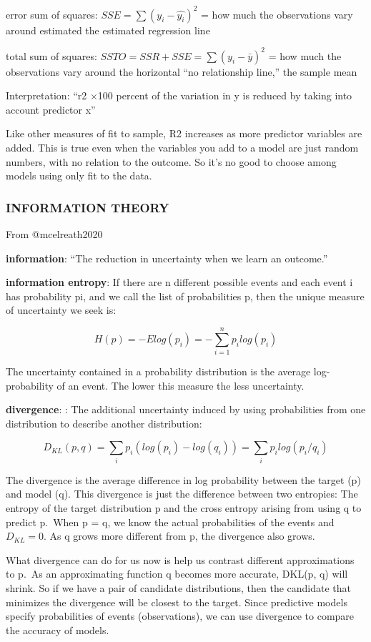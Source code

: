 \documentclass[
]{article}
\begin{document}
error sum of squares: \(SSE = \sum(y_i- \hat{y_i})^2\) = how much the
observations vary around estimated the estimated regression line

total sum of squares: \(SSTO = SSR + SSE =\sum(y_i- \bar{y})^2\) = how
much the observations vary around the horizontal ``no relationship
line,'' the sample mean

Interpretation: ``r2 ×100 percent of the variation in y is reduced by
taking into account predictor x''

Like other measures of fit to sample, R2 increases as more predictor
variables are added. This is true even when the variables you add to a
model are just random numbers, with no relation to the outcome. So it's
no good to choose among models using only fit to the data.

\hypertarget{information-theory}{%
\subsubsection{INFORMATION THEORY}\label{information-theory}}

From @mcelreath2020

\textbf{information}: ``The reduction in uncertainty when we learn an
outcome.''

\textbf{information entropy}: If there are n different possible events
and each event i has probability pi, and we call the list of
probabilities p, then the unique measure of uncertainty we seek is:

\[H(p) = -E log(p_i) = -\sum_{i=1}^n p_i log(p_i)\]

The uncertainty contained in a probability distribution is the average
log-probability of an event. The lower this measure the less
uncertainty.

\textbf{divergence}: : The additional uncertainty induced by using
probabilities from one distribution to describe another distribution:

\[D_{KL} (p,q) = \sum_{i} p_i (log(p_i)-log(q_i)) = \sum_{i} p_i log(p_i/q_i)\]

The divergence is the average difference in log probability between the
target (p) and model (q). This divergence is just the difference between
two entropies: The entropy of the target distribution p and the cross
entropy arising from using q to predict p.~When p = q, we know the
actual probabilities of the events and \(D_{KL} = 0\). As q grows more
different from p, the divergence also grows.

What divergence can do for us now is help us contrast different
approximations to p.~As an approximating function q becomes more
accurate, DKL(p, q) will shrink. So if we have a pair of candidate
distributions, then the candidate that minimizes the divergence will be
closest to the target. Since predictive models specify probabilities of
events (observations), we can use divergence to compare the accuracy of
models.
\end{document}
